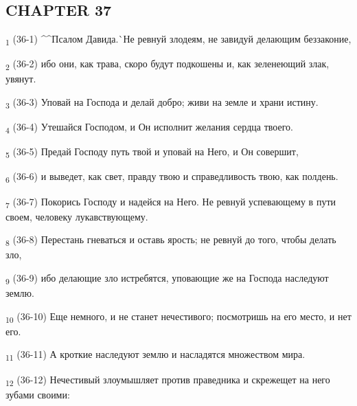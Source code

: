 \subsection{CHAPTER 37}
\begin{tcolorbox}
\textsubscript{1} (36-1) ^^Псалом Давида.^^ Не ревнуй злодеям, не завидуй делающим беззаконие,
\end{tcolorbox}
\begin{tcolorbox}
\textsubscript{2} (36-2) ибо они, как трава, скоро будут подкошены и, как зеленеющий злак, увянут.
\end{tcolorbox}
\begin{tcolorbox}
\textsubscript{3} (36-3) Уповай на Господа и делай добро; живи на земле и храни истину.
\end{tcolorbox}
\begin{tcolorbox}
\textsubscript{4} (36-4) Утешайся Господом, и Он исполнит желания сердца твоего.
\end{tcolorbox}
\begin{tcolorbox}
\textsubscript{5} (36-5) Предай Господу путь твой и уповай на Него, и Он совершит,
\end{tcolorbox}
\begin{tcolorbox}
\textsubscript{6} (36-6) и выведет, как свет, правду твою и справедливость твою, как полдень.
\end{tcolorbox}
\begin{tcolorbox}
\textsubscript{7} (36-7) Покорись Господу и надейся на Него. Не ревнуй успевающему в пути своем, человеку лукавствующему.
\end{tcolorbox}
\begin{tcolorbox}
\textsubscript{8} (36-8) Перестань гневаться и оставь ярость; не ревнуй до того, чтобы делать зло,
\end{tcolorbox}
\begin{tcolorbox}
\textsubscript{9} (36-9) ибо делающие зло истребятся, уповающие же на Господа наследуют землю.
\end{tcolorbox}
\begin{tcolorbox}
\textsubscript{10} (36-10) Еще немного, и не станет нечестивого; посмотришь на его место, и нет его.
\end{tcolorbox}
\begin{tcolorbox}
\textsubscript{11} (36-11) А кроткие наследуют землю и насладятся множеством мира.
\end{tcolorbox}
\begin{tcolorbox}
\textsubscript{12} (36-12) Нечестивый злоумышляет против праведника и скрежещет на него зубами своими:
\end{tcolorbox}
